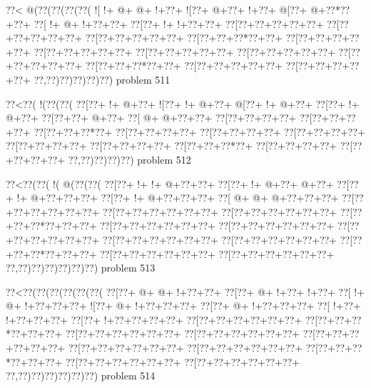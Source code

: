 \vbox{\vbox{\goo
\0??<\- @(\0??(\0??(\0??(\0??(
\- ![\- !+\- @+\- @+\- !+\0??+
\- ![\0??+\- @+\0??+\- !+\0??+
\- @[\0??+\- @+\0??*\0??+\0??+
\0??[\- !+\- @+\- !+\0??+\0??+
\0??[\0??+\- !+\- !+\0??+\0??+
\0??[\0??+\0??+\0??+\0??+\0??+
\0??[\0??+\0??+\0??+\0??+\0??+
\0??[\0??+\0??+\0??+\0??+\0??+
\0??[\0??+\0??+\0??*\0??+\0??+
\0??[\0??+\0??+\0??+\0??+\0??+
\0??[\0??+\0??+\0??+\0??+\0??+
\0??[\0??+\0??+\0??+\0??+\0??+
\0??[\0??+\0??+\0??+\0??+\0??+
\0??[\0??+\0??+\0??+\0??+\0??+
\0??[\0??+\0??+\0??*\0??+\0??+
\0??[\0??+\0??+\0??+\0??+\0??+
\0??[\0??+\0??+\0??+\0??+\0??+
\0??,\0??)\0??)\0??)\0??)\0??)
}
\hfil problem 511\hfil\break
}

\vbox{\vbox{\goo
\0??<\0??(\- !(\0??(\0??(
\0??[\0??+\- !+\- @+\0??+
\- ![\0??+\- !+\- @+\0??+
\- @[\0??+\- !+\- @+\0??+
\0??[\0??+\- !+\- @+\0??+
\0??[\0??+\0??+\- @+\0??+
\0??[\- @+\- @+\0??+\0??+
\0??[\0??+\0??+\0??+\0??+
\0??[\0??+\0??+\0??+\0??+
\0??[\0??+\0??+\0??*\0??+
\0??[\0??+\0??+\0??+\0??+
\0??[\0??+\0??+\0??+\0??+
\0??[\0??+\0??+\0??+\0??+
\0??[\0??+\0??+\0??+\0??+
\0??[\0??+\0??+\0??+\0??+
\0??[\0??+\0??+\0??*\0??+
\0??[\0??+\0??+\0??+\0??+
\0??[\0??+\0??+\0??+\0??+
\0??,\0??)\0??)\0??)\0??)
}
\hfil problem 512\hfil\break
}

\vbox{\vbox{\goo
\0??<\0??(\0??(\- !(\- @(\0??(\0??(
\0??[\0??+\- !+\- !+\- @+\0??+\0??+
\0??[\0??+\- !+\- @+\0??+\- @+\0??+
\0??[\0??+\- !+\- @+\0??+\0??+\0??+
\0??[\0??+\- !+\- @+\0??+\0??+\0??+
\0??[\- @+\- @+\- @+\0??+\0??+\0??+
\0??[\0??+\0??+\0??+\0??+\0??+\0??+
\0??[\0??+\0??+\0??+\0??+\0??+\0??+
\0??[\0??+\0??+\0??+\0??+\0??+\0??+
\0??[\0??+\0??+\0??*\0??+\0??+\0??+
\0??[\0??+\0??+\0??+\0??+\0??+\0??+
\0??[\0??+\0??+\0??+\0??+\0??+\0??+
\0??[\0??+\0??+\0??+\0??+\0??+\0??+
\0??[\0??+\0??+\0??+\0??+\0??+\0??+
\0??[\0??+\0??+\0??+\0??+\0??+\0??+
\0??[\0??+\0??+\0??*\0??+\0??+\0??+
\0??[\0??+\0??+\0??+\0??+\0??+\0??+
\0??[\0??+\0??+\0??+\0??+\0??+\0??+
\0??,\0??)\0??)\0??)\0??)\0??)\0??)
}
\hfil problem 513\hfil\break
}

\vbox{\vbox{\goo
\0??<\0??(\0??(\0??(\0??(\0??(\0??(
\0??[\0??+\- @+\- @+\- !+\0??+\0??+
\0??[\0??+\- @+\- !+\0??+\- !+\0??+
\0??[\- !+\- @+\- !+\0??+\0??+\0??+
\- ![\0??+\- @+\- !+\0??+\0??+\0??+
\0??[\0??+\- @+\- !+\0??+\0??+\0??+
\0??[\- !+\0??+\- !+\0??+\0??+\0??+
\0??[\0??+\- !+\0??+\0??+\0??+\0??+
\0??[\0??+\0??+\0??+\0??+\0??+\0??+
\0??[\0??+\0??+\0??*\0??+\0??+\0??+
\0??[\0??+\0??+\0??+\0??+\0??+\0??+
\0??[\0??+\0??+\0??+\0??+\0??+\0??+
\0??[\0??+\0??+\0??+\0??+\0??+\0??+
\0??[\0??+\0??+\0??+\0??+\0??+\0??+
\0??[\0??+\0??+\0??+\0??+\0??+\0??+
\0??[\0??+\0??+\0??*\0??+\0??+\0??+
\0??[\0??+\0??+\0??+\0??+\0??+\0??+
\0??[\0??+\0??+\0??+\0??+\0??+\0??+
\0??,\0??)\0??)\0??)\0??)\0??)\0??)
}
\hfil problem 514\hfil\break
}

